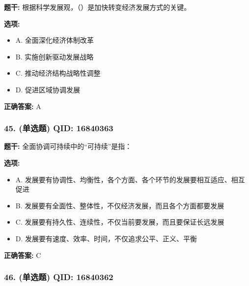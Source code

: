 \documentclass[12pt,UTF8]{ctexart}
\begin{document}
\textbf{题干:}
根据科学发展观，（）是加快转变经济发展方式的关键。

\textbf{选项:}
\begin{itemize}[leftmargin=*]

  \item A. 全面深化经济体制改革

  \item B. 实施创新驱动发展战略

  \item C. 推动经济结构战略性调整

  \item D. 促进区域协调发展

\end{itemize}

\textbf{正确答案:}
A

\vspace{0.3em}\hrulefill\vspace{0.7em}

\subsubsection*{45. (单选题) \small QID: 16840363}

\textbf{题干:}
全面协调可持续中的“可持续”是指：

\textbf{选项:}
\begin{itemize}[leftmargin=*]

  \item A. 发展要有协调性、均衡性，各个方面、各个环节的发展要相互适应、相互促进

  \item B. 发展要有全面性、整体性，不仅经济发展，而且各个方面都要发展

  \item C. 发展要有持久性、连续性，不仅当前要发展，而且要保证长远发展

  \item D. 发展要有速度、效率、时间，不仅追求公平、正义、平衡

\end{itemize}

\textbf{正确答案:}
C

\vspace{0.3em}\hrulefill\vspace{0.7em}

\subsubsection*{46. (单选题) \small QID: 16840362}
\end{document}
